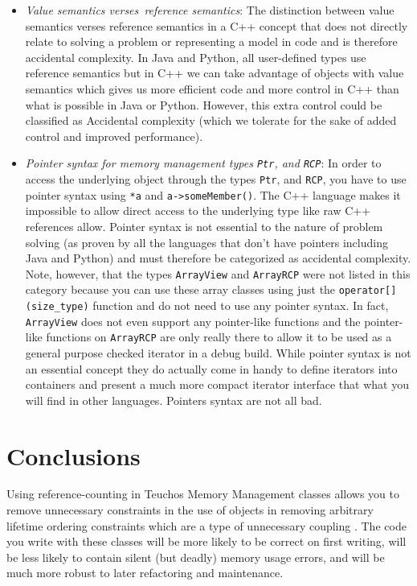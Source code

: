 \documentclass[pdf,ps2pdf,11pt]{SANDreport}
\begin{document}
\begin{itemize}

{}\item\textit{Value semantics verses\ reference semantics}: The
distinction between value semantics verses reference semantics in a
C++ concept that does not directly relate to solving a problem or
representing a model in code and is therefore accidental complexity.
In Java and Python, all user-defined types use reference semantics but
in C++ we can take advantage of objects with value semantics which
gives us more efficient code and more control in C++ than what is
possible in Java or Python.  However, this extra control could be
classified as Accidental complexity (which we tolerate for the sake
of added control and improved performance).

{}\item\textit{Pointer syntax for memory management types
{}\texttt{Ptr}, and {}\texttt{RCP}}: In order to access the underlying
object through the types {}\texttt{Ptr}, and {}\texttt{RCP}, you have
to use pointer syntax using {}\texttt{*a} and
{}\texttt{a->someMember()}.  The C++ language makes it impossible to
allow direct access to the underlying type like raw C++ references
allow.  Pointer syntax is not essential to the nature of problem
solving (as proven by all the languages that don't have pointers
including Java and Python) and must therefore be categorized as
accidental complexity.  Note, however, that the types
{}\texttt{ArrayView} and {}\texttt{ArrayRCP} were not listed in this
category because you can use these array classes using just the
{}\texttt{operator[](size\_type)} function and do not need to use any
pointer syntax.  In fact, {}\texttt{ArrayView} does not even support
any pointer-like functions and the pointer-like functions on
{}\texttt{ArrayRCP} are only really there to allow it to be used as a
general purpose checked iterator in a debug build.  While pointer
syntax is not an essential concept they do actually come in handy to
define iterators into containers and present a much more compact
iterator interface that what you will find in other languages.
Pointers syntax are not all bad.

\end{itemize}

%
{}\section{Conclusions}
\label{sec:conclusions}
%

Using reference-counting in Teuchos Memory Management classes allows
you to remove unnecessary constraints in the use of objects in
removing arbitrary lifetime ordering constraints which are a type of
unnecessary coupling {}\cite{CodeComplete2nd04}.  The code you write
with these classes will be more likely to be correct on first writing,
will be less likely to contain silent (but deadly) memory usage
errors, and will be much more robust to later refactoring and
maintenance.
\end{document}
